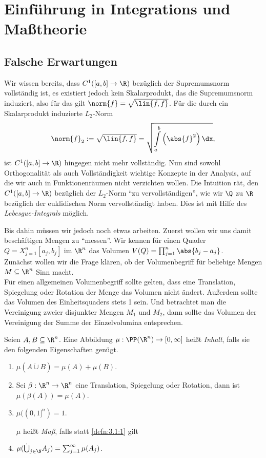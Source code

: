 \section{Einführung in Integrations und Maßtheorie}

\subsection{Falsche Erwartungen}

Wir wissen bereits, dass $C^1([a,b]\to\R)$ bezüglich der Supremumsnorm
vollständig ist, es existiert jedoch kein Skalarprodukt, das die Supremumsnorm
induziert, also für das gilt $\norm{f} = \sqrt{\lin{f,f}}$. Für die
durch ein Skalarprodukt induzierte $L_2$-Norm
\begin{align*}
\norm{f}_2 := \sqrt{\lin{f,f}} = \sqrt{\int\limits_a^b \left(\abs{f}^2\right)\dx},
\end{align*}
ist $C^1([a,b]\to\R)$ hingegen nicht mehr vollständig. Nun sind sowohl
Orthogonalität als auch Vollständigkeit wichtige Konzepte in der Analysis, auf
die wir auch in Funktionenräumen nicht verzichten wollen. Die Intuition rät,
den $C^1([a,b]\to\R)$ bezüglich der $L_2$-Norm ``zu
vervollständigen'', wie wir $\Q$ zu $\R$ bezüglich der euklidischen Norm
vervollständigt haben. Dies ist mit Hilfe des \emph{Lebesgue-Integrals} möglich.

Bis dahin müssen wir jedoch noch etwas arbeiten. Zuerst wollen wir uns damit
beschäftigen Mengen zu ``messen''. Wir kennen für einen Quader
$Q=X_{j=1}^n [a_j,b_j]$ im $\R^n$ das Volumen $V(Q) = \prod_{j=1}^n
\abs{b_j-a_j}$.\\
Zunächst wollen wir die Frage klären, ob der
Volumenbegriff für beliebige Mengen $M\subseteq\R^n$ Sinn macht.\\
Für einen allgemeinen Volumenbegriff sollte gelten, dass eine Translation,
Spiegelung oder Rotation der Menge das Volumen nicht ändert. Außerdem sollte das
Volumen des Einheitsquaders stets 1 sein. Und betrachtet man die Vereinigung zweier
disjunkter Mengen $M_1$ und $M_2$, dann sollte das Volumen der Vereinigung der
Summe der Einzelvolumina entsprechen.

\begin{defn}
\label{defn:3.1}
Seien $A,B\subseteq\R^n$. Eine Abbildung $\mu: \PP(\R^n)\to[0,\infty]$ heißt
\emph{Inhalt}, falls sie den folgenden Eigenschaften genügt.
\begin{enumerate}[label=(\roman{*})]
  \item\label{defn:3.1:1} $\mu(A\dot{\cup} B) = \mu(A)+\mu(B)$.
  \item Sei $\beta: \R^n\to\R^n$ eine Translation, Spiegelung oder Rotation,
  dann ist $\mu(\beta(A)) = \mu(A)$.
  \item $\mu((0,1]^n)=1$.
  \par
$\mu$ heißt \emph{Maß}, falls statt \ref{defn:3.1:1} gilt
\item $\mu(\dot{\bigcup}_{j\in\N} A_j) = \sum_{j=1}^\infty \mu(A_j)$.\fishhere
\end{enumerate}
\end{defn}

